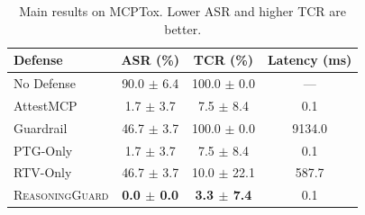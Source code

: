 \begin{table}[t]
\centering
\small
\begin{tabular}{lccc}
\toprule
Defense & ASR (\%) & TCR (\%) & Latency (ms) \\
\midrule
No Defense & 90.0 $\pm$ 6.4 & 100.0 $\pm$ 0.0 & --- \\
AttestMCP & 1.7 $\pm$ 3.7 & 7.5 $\pm$ 8.4 & 0.1 \\
Guardrail & 46.7 $\pm$ 3.7 & 100.0 $\pm$ 0.0 & 9134.0 \\
PTG-Only & 1.7 $\pm$ 3.7 & 7.5 $\pm$ 8.4 & 0.1 \\
RTV-Only & 46.7 $\pm$ 3.7 & 10.0 $\pm$ 22.1 & 587.7 \\
\textsc{ReasoningGuard} & \textbf{0.0 $\pm$ 0.0} & \textbf{3.3 $\pm$ 7.4} & 0.1 \\
\bottomrule
\end{tabular}
\caption{Main results on MCPTox. Lower ASR and higher TCR are better.}
\label{tab:main}
\end{table}
